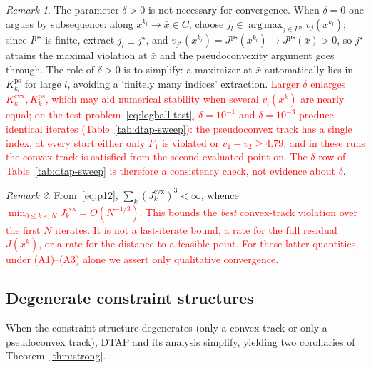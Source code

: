 \documentclass[]{interact}
\theoremstyle{plain}
\theoremstyle{definition}
\theoremstyle{remark}
\newtheorem{remark}{Remark}
\DeclareMathOperator*{\argmax}{arg\,max}
\newcommand{\cvx}{\mathrm{cvx}}
\newcommand{\ps}{\mathrm{ps}}
\newcommand{\dtap}{\textsc{DTAP}}
\begin{document}
\begin{remark}\label{rem:delta-role}
The parameter $\delta>0$ is not necessary for convergence. When $\delta=0$ one argues by
subsequence: along $x^{k_l}\to\bar x\in C$, choose
$j_l\in\argmax_{j\in I^{\ps}}v_j(x^{k_l})$; since $I^{\ps}$ is finite, extract
$j_l\equiv j^\star$, and $v_{j^\star}(x^{k_l})=J^{\ps}(x^{k_l})\to J^{\ps}(\bar x)>0$, so
$j^\star$ attains the maximal violation at $\bar x$ and the pseudoconvexity argument
goes through. The role of $\delta>0$ is to simplify: a maximizer at $\bar x$ automatically
lies in $K^{\ps}_{k_l}$ for large $l$, avoiding a `finitely many indices' extraction.
\leavevmode\textcolor{red}{Larger $\delta$ enlarges $K^{\cvx}_k,K^{\ps}_k$, which may aid numerical stability when several
$v_i(x^k)$ are nearly equal; on the test problem~\eqref{eq:logball-test}, $\delta=10^{-1}$ and $\delta=10^{-3}$ produce identical iterates
(Table~\ref{tab:dtap-sweep}): the pseudoconvex track has a single index, at every start either only $F_1$ is violated
or $v_1-v_2\ge4.79$, and in these runs the convex track is satisfied from the second evaluated point on. The $\delta$ row
of Table~\ref{tab:dtap-sweep} is therefore a consistency check, not evidence about $\delta$}.
\end{remark}

\begin{remark}\label{rem:rate}
From~\eqref{eq:p12}, $\sum_k(J^{\cvx}_k)^3<\infty$, whence
\leavevmode\textcolor{red}{$\min_{0\le k<N}J^{\cvx}_k=O(N^{-1/3})$. This bounds the \emph{best} convex-track violation
over the first $N$ iterates. It is not a last-iterate bound, a rate for the full residual
$J(x^k)$, or a rate for the distance to a feasible point. For these latter quantities,
under (A1)--(A3) alone we assert only qualitative convergence.}
\end{remark}

\subsection{Degenerate constraint structures}\label{ssec:degenerate}
When the constraint structure degenerates (only a convex track or only a pseudoconvex
track), \dtap{} and its analysis simplify, yielding two corollaries of
Theorem~\ref{thm:strong}.
\end{document}
